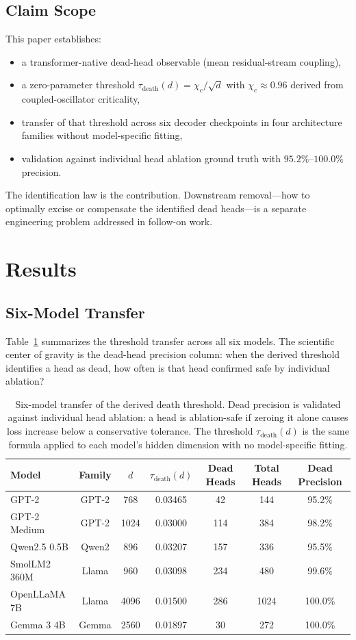 \documentclass[aps,prd,onecolumn,superscriptaddress,showpacs,12pt]{revtex4-2}
\newcommand{\taudeath}{\tau_{\mathrm{death}}}
\newcommand{\chic}{\chi_c}
\begin{document}
\subsection{Claim Scope}

This paper establishes:
\begin{itemize}
\item a transformer-native dead-head observable (mean residual-stream coupling),
\item a zero-parameter threshold $\taudeath(d)=\chic/\sqrt{d}$ with $\chic \approx 0.96$
derived from coupled-oscillator criticality,
\item transfer of that threshold across six decoder checkpoints in four architecture
families without model-specific fitting,
\item validation against individual head ablation ground truth with $95.2\%$--$100.0\%$
precision.
\end{itemize}
The identification law is the contribution. Downstream removal---how to
optimally excise or compensate the identified dead heads---is a separate
engineering problem addressed in follow-on work.

\section{Results}

\subsection{Six-Model Transfer}

Table~\ref{tab:main-matrix} summarizes the threshold transfer across all six
models. The scientific center of gravity is the dead-head precision column:
when the derived threshold identifies a head as dead, how often is that head
confirmed safe by individual ablation?

\begin{table}[t]
\caption{\label{tab:main-matrix} Six-model transfer of the derived death threshold.
Dead precision is validated against individual head ablation: a head is ablation-safe if
zeroing it alone causes loss increase below a conservative tolerance. The threshold
$\taudeath(d)$ is the same formula applied to each model's hidden dimension with no
model-specific fitting.}
\begin{tabular}{lcccccc}
\toprule
Model & Family & $d$ & $\taudeath(d)$ & Dead Heads & Total Heads & Dead Precision \\
\midrule
GPT-2 & GPT-2 & 768 & 0.03465 & 42 & 144 & 95.2\% \\
GPT-2 Medium & GPT-2 & 1024 & 0.03000 & 114 & 384 & 98.2\% \\
Qwen2.5 0.5B & Qwen2 & 896 & 0.03207 & 157 & 336 & 95.5\% \\
SmolLM2 360M & Llama & 960 & 0.03098 & 234 & 480 & 99.6\% \\
OpenLLaMA 7B & Llama & 4096 & 0.01500 & 286 & 1024 & 100.0\% \\
Gemma 3 4B & Gemma & 2560 & 0.01897 & 30 & 272 & 100.0\% \\
\bottomrule
\end{tabular}
\end{table}
\end{document}
